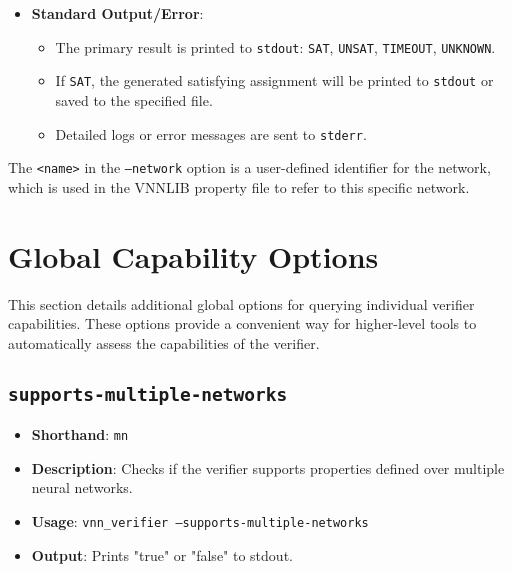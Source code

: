 \begin{itemize}
    \item \textbf{Standard Output/Error}:
    \begin{itemize}
        \item The primary result is printed to \texttt{stdout}: \texttt{SAT}, \texttt{UNSAT}, \texttt{TIMEOUT}, \texttt{UNKNOWN}.
        \item If \texttt{SAT}, the generated satisfying assignment will be printed to \texttt{stdout} or saved to the specified file.
        \item Detailed logs or error messages are sent to \texttt{stderr}.
    \end{itemize}
\end{itemize}

The \texttt{<name>} in the \texttt{--network} option is a user-defined identifier for the network, which is used in the VNNLIB property file to refer to this specific network.

\section{Global Capability Options}

This section details additional global options for querying individual verifier capabilities. These options provide a convenient way for higher-level tools to automatically assess the capabilities of the verifier.

\subsection{\texttt{supports-multiple-networks}}
\begin{itemize}
    \item \textbf{Shorthand}: \texttt{mn}
    \item \textbf{Description}: Checks if the verifier supports properties defined over multiple neural networks. 
    \item \textbf{Usage}: \texttt{vnn\_verifier --supports-multiple-networks}
    \item \textbf{Output}: Prints "true" or "false" to stdout.
\end{itemize}

